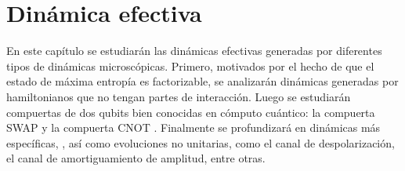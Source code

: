 \chapter{Dinámica efectiva}

En este capítulo se estudiarán las dinámicas efectivas generadas   por diferentes tipos de dinámicas microscópicas. Primero, motivados por el hecho de que el estado de máxima entropía es factorizable, se analizarán dinámicas generadas por hamiltonianos que no tengan partes de interacción. Luego se estudiarán compuertas de dos qubits bien conocidas en cómputo cuántico: la compuerta SWAP y la compuerta CNOT . Finalmente se profundizará en dinámicas más específicas, , así como evoluciones no unitarias, como el canal de despolarización, el canal de amortiguamiento de amplitud, entre otras.




\newpage